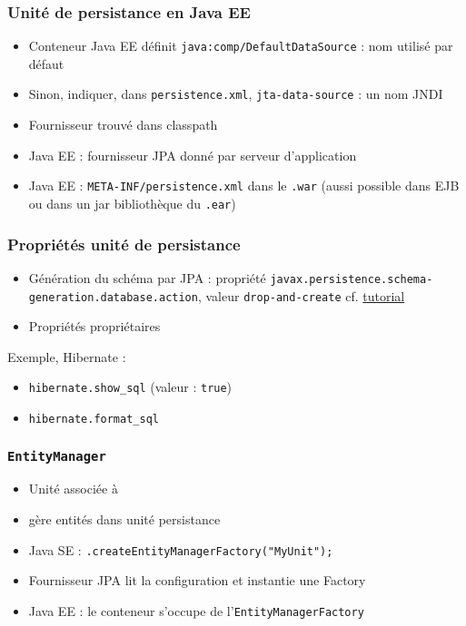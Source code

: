 \documentclass[english, french]{beamer}
\begin{document}
\begin{frame}
	\frametitle{Unité de persistance en Java EE}
	\begin{itemize}
		\item Conteneur Java EE définit \texttt{java:comp/DefaultDataSource} : nom utilisé par défaut
		\item Sinon, indiquer, dans \texttt{persistence.xml}, \texttt{jta-data-source} : un nom JNDI
		\item Fournisseur trouvé dans classpath
		\item Java EE : fournisseur JPA donné par serveur d’application
		\item Java EE : \texttt{META-INF/persistence.xml} dans le \texttt{.war} {\tiny (aussi possible dans EJB ou dans un jar bibliothèque du \texttt{.ear})}
	\end{itemize}
\end{frame}

\begin{frame}
	\frametitle{Propriétés unité de persistance}
	\begin{itemize}
		\item Génération du schéma par JPA : propriété {\small\texttt{javax.persistence.schema-generation.database.action}}, valeur {\small\texttt{drop-and-create}} {\tiny cf. \href{https://docs.oracle.com/javaee/7/tutorial/persistence-intro005.htm}{tutorial}}
		\item Propriétés propriétaires
	\end{itemize}
Exemple, Hibernate :
	\begin{itemize}
		\item \texttt{hibernate.show\_sql} (valeur : \texttt{true})
		\item \texttt{hibernate.format\_sql}
	\end{itemize}
\end{frame}

\begin{frame}
	\frametitle{\texttt{EntityManager}}
	\begin{itemize}
		\item Unité associée à 
		\item {} gère entités dans unité persistance
		\item Java SE : {\small \texttt{.createEntityManagerFactory("MyUnit");}}
		\item Fournisseur JPA lit la configuration et instantie une Factory
		\item Java EE : le conteneur s’occupe de l’\texttt{EntityManagerFactory}
	\end{itemize}
\end{frame}
\end{document}
